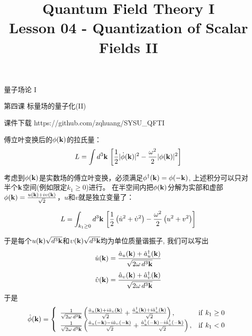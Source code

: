 \documentclass[CJK]{beamer}
\title{Quantum Field Theory I \\ Lesson 04 - Quantization of Scalar Fields II}
\author{}
\date{}
\begin{document}
\begin{frame}
 
\begin{center}
\begin{Large}
\bch
量子场论 I 

{\vskip 0.3in}

第四课 标量场的量子化(II)

\ech
\end{Large}
\end{center}

\vskip 0.2in

\bch
课件下载
\ech
https://github.com/zqhuang/SYSU\_QFTI

\end{frame}



\begin{frame}
\bch
傅立叶变换后的$\phi({\mathbf{k}})$的拉氏量：
$$L = \int d^3{\mathbf{k}}\, \left[\frac{1}{2}|\dot\phi({\mathbf{k}})|^2 - \frac{\omega^2}{2}|\phi({\mathbf{k}})|^2\right]$$
\skipline

考虑到$\phi({\mathbf{k}})$是实数场的傅立叶变换，必须满足$\phi^\dagger({\mathbf{k}}) = \phi(-{\mathbf{k}})$, 上述积分可以只对半个${\mathbf{k}}$空间(例如限定$k_1\ge 0$)进行。 在半空间内把$\phi({\mathbf{k}})$分解为实部和虚部$\phi({\mathbf{k}}) = \frac{u({\mathbf{k}}) + i \upsilon({\mathbf{k}})}{\sqrt{2}}$，$u$和$v$就是独立变量了：

\skipline
$$L = \int_{k_1\ge 0} d^3{\mathbf{k}}\,\left[ \frac{1}{2}\left(\dot u^2 + \dot {\upsilon}^2 \right) - \frac{\omega^2}{2}\left(u^2+v^2\right)\right]$$

\ech

\end{frame}

\begin{frame}
\bch
于是每个$u({\mathbf{k}})\sqrt{d^3{\mathbf{k}}}$和$\upsilon({\mathbf{k}})\sqrt{d^3{\mathbf{k}}}$均为单位质量谐振子, 我们可以写出
$$\hat{u}({\mathbf{k}})  = \frac{{\hat{a}}_u({\mathbf{k}}) + {\hat{a}^\dagger}_u({\mathbf{k}})}{\sqrt{2\omega\, d^3{\mathbf{k}}}}$$
$$\hat{\upsilon}({\mathbf{k}})  = \frac{{\hat{a}}_{\upsilon}({\mathbf{k}}) + {\hat{a}^\dagger}_{\upsilon}({\mathbf{k}})}{\sqrt{2\omega\, d^3{\mathbf{k}}}}$$
于是
\begin{equation}
{\hat{\phi}}({\mathbf{k}}) = \left\{
\begin{array}{ll}
\frac{1}{\sqrt{2\omega\, d^3{\mathbf{k}}}}\left(\frac{{\hat{a}}_u({\mathbf{k}}) + i{\hat{a}}_\upsilon({\mathbf{k}})}{\sqrt{2}} + \frac{{\hat{a}^\dagger}_u({\mathbf{k}})+i{\hat{a}^\dagger}_\upsilon({\mathbf{k}})}{\sqrt{2}}\right), & \mathrm{if\ }k_1\ge 0 \\
\frac{1}{\sqrt{2\omega\, d^3{\mathbf{k}}}}\left(\frac{{\hat{a}}_u(-{\mathbf{k}}) - i{\hat{a}}_\upsilon(-{\mathbf{k}})}{\sqrt{2}} + \frac{{\hat{a}^\dagger}_u(-{\mathbf{k}})-i{\hat{a}^\dagger}_\upsilon(-{\mathbf{k}})}{\sqrt{2}}\right), & \mathrm{if\ }k_1< 0 
\end{array}
\right.
\end{equation}

\ech
\end{frame}
\end{document}
